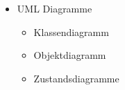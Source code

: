\begin{itemize}
    \item UML Diagramme
    \begin{itemize}
        \item Klassendiagramm
        \item Objektdiagramm
        \item Zustandsdiagramme
    \end{itemize}
    
    
    
\end{itemize}
